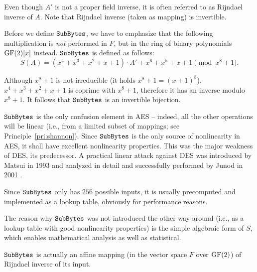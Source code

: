 	\begin{note}
	\label{note:rijinv}
		Even though $A'$ is not a proper field inverse, it is often referred to as {Rijndael inverse} of $A$. Note that Rijndael inverse (taken as mapping) is invertible.
	\end{note}
	
	Before we define $\texttt{SubBytes}$, we have to emphasize that the following multiplication is {\em not} performed in $F$, but in the ring of binary polynomials $\mathrm{GF}(2)[x]$ instead. $\texttt{SubBytes}$ is defined as follows:
	\newcommand{\defsbox}{S(A) = (x^4 + x^3 + x^2 + x + 1) \cdot A' + x^6 + x^5 + x + 1 \pmod{x^8+1}}
	\begin{equation}
	\label{eq:sbox}
		\defsbox .
	\end{equation}
	
	\begin{note}
	\label{note:sboxinv}
		Although $x^8+1$ is not irreducible (it holds $x^8+1 = (x+1)^8$), $x^4 + x^3 + x^2 + x + 1$ is coprime with $x^8+1$, therefore it has an inverse modulo $x^8+1$. It follows that $\texttt{SubBytes}$ is an invertible bijection.
	\end{note}
	
	$\texttt{SubBytes}$ is the only confusion element in AES -- indeed, all the other operations will be linear (i.e., from a limited subset of mappings; see Principle~\ref{pri:shannon}). Since $\texttt{SubBytes}$ is the only source of nonlinearity in AES, it shall have excellent nonlinearity properties. This was the major weakness of DES, its predecessor. A practical linear attack against DES was introduced by Matsui \cite{matsui1993linear} in 1993 and analyzed in detail and successfully performed by Junod in 2001 \cite{junod2001complexity}.
	
	\begin{remark}
	\label{rem:sboxtable}
		Since $\texttt{SubBytes}$ only has $256$ possible inputs, it is usually precomputed and implemented as a lookup table, obviously for performance reasons.
	\end{remark}
	
	The reason why $\texttt{SubBytes}$ was not introduced the other way around (i.e., as a lookup table with good nonlinearity properties) is the simple algebraic form of $S$, which enables mathematical analysis as well as statistical.
	
	\begin{remark}
	\label{rem:sboxaff}
		$\texttt{SubBytes}$ is actually an affine mapping (in the vector space $F$ over $\mathrm{GF}(2)$) of Rijndael inverse of its input.
	\end{remark}

